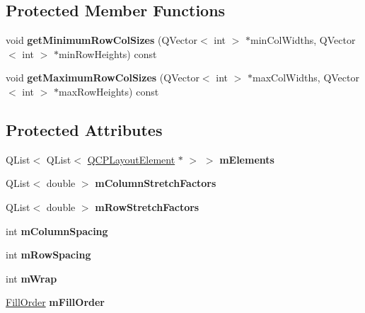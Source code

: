 \subsection*{Protected Member Functions}
\begin{DoxyCompactItemize}
\item 
\mbox{\label{class_q_c_p_layout_grid_a4b9a251919936f127a63fc1b9911cd4e}} 
void {\bfseries get\+Minimum\+Row\+Col\+Sizes} (Q\+Vector$<$ int $>$ $\ast$min\+Col\+Widths, Q\+Vector$<$ int $>$ $\ast$min\+Row\+Heights) const
\item 
\mbox{\label{class_q_c_p_layout_grid_a9be77011ec5b5dfbe7fbda126659e1eb}} 
void {\bfseries get\+Maximum\+Row\+Col\+Sizes} (Q\+Vector$<$ int $>$ $\ast$max\+Col\+Widths, Q\+Vector$<$ int $>$ $\ast$max\+Row\+Heights) const
\end{DoxyCompactItemize}
\subsection*{Protected Attributes}
\begin{DoxyCompactItemize}
\item 
\mbox{\label{class_q_c_p_layout_grid_a3577d3855bf8ad20ef9079291a49f397}} 
Q\+List$<$ Q\+List$<$ \hyperlink{class_q_c_p_layout_element}{Q\+C\+P\+Layout\+Element} $\ast$ $>$ $>$ {\bfseries m\+Elements}
\item 
\mbox{\label{class_q_c_p_layout_grid_ac6aabe62339f94f18b9f8adab94b1840}} 
Q\+List$<$ double $>$ {\bfseries m\+Column\+Stretch\+Factors}
\item 
\mbox{\label{class_q_c_p_layout_grid_a36c85a7eaf342680fb9b8a4977486f16}} 
Q\+List$<$ double $>$ {\bfseries m\+Row\+Stretch\+Factors}
\item 
\mbox{\label{class_q_c_p_layout_grid_ae9ac48f0791be07ead0a96dbd5622770}} 
int {\bfseries m\+Column\+Spacing}
\item 
\mbox{\label{class_q_c_p_layout_grid_a8b67f183f4645739cc4c794d75843b40}} 
int {\bfseries m\+Row\+Spacing}
\item 
\mbox{\label{class_q_c_p_layout_grid_a17d90c289139847f68cca9e75d64b0fd}} 
int {\bfseries m\+Wrap}
\item 
\mbox{\label{class_q_c_p_layout_grid_a35a20072cbca5659dd75ca74eae87beb}} 
\hyperlink{class_q_c_p_layout_grid_a7d49ee08773de6b2fd246edfed353cca}{Fill\+Order} {\bfseries m\+Fill\+Order}
\end{DoxyCompactItemize}

